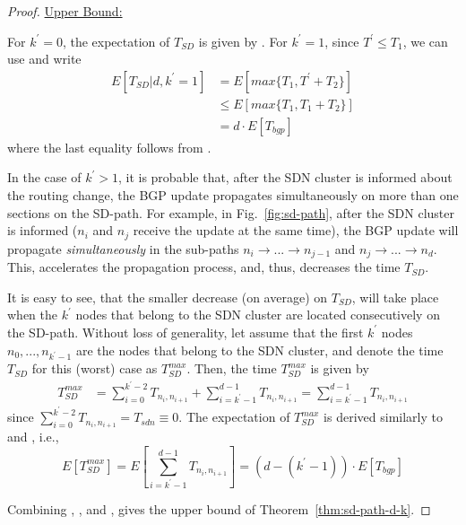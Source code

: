 \begin{proof}
\vspace{\baselineskip}
\noindent\underline{Upper Bound:}

For $k^{'}=0$, the expectation of $T_{SD}$ is given by . For $k^{'}=1$, since $T^{'}\leq T_{1}$, we can use  and write
\begin{align}
E[T_{SD}|d,k^{'}=1] 
&= E\left[max\{T_{1} , T^{'}+T_{2}\}\right] \\
&\leq E\left[max\{T_{1} , T_{1}+T_{2}\}\right] \\
&= d\cdot E[T_{bgp}] \label{eq:upper-bound-k=1}
\end{align}
where the last equality follows from .

In the case of $k^{'}>1$, it is probable that, after the SDN cluster is informed about the routing change, the BGP update propagates simultaneously on more than one sections on the SD-path. For example, in Fig.~\ref{fig:sd-path}, after the SDN cluster is informed ($n_{i}$ and $n_{j}$ receive the update at the same time), the BGP update will propagate \textit{simultaneously} in the sub-paths $n_{i}\rightarrow ...\rightarrow n_{j-1}$ and $n_{j}\rightarrow ...\rightarrow n_{d}$. This, accelerates the propagation process, and, thus, decreases the time $T_{SD}$. 

It is easy to see, that the smaller decrease (on average) on $T_{SD}$, will take place when the $k^{'}$ nodes that belong to the SDN cluster are located consecutively on the SD-path. Without loss of generality, let assume that the first $k^{'}$ nodes $n_{0},...,n_{k^{'}-1}$ are the nodes that belong to the SDN cluster, and denote the time $T_{SD}$ for this (worst) case as $T_{SD}^{max}$. Then, the time $T_{SD}^{max}$ is given by
\begin{align}
T_{SD}^{max} 	&= \sum_{i=0}^{k^{'}-2}T_{n_{i},n_{i+1}} + \sum_{i=k^{'}-1}^{d-1}T_{n_{i},n_{i+1}} = \sum_{i=k^{'}-1}^{d-1}T_{n_{i},n_{i+1}}
\end{align}
since $\sum_{i=0}^{k^{'}-2}T_{n_{i},n_{i+1}} = T_{sdn}\equiv 0$. The expectation of $T_{SD}^{max}$ is derived similarly to  and , i.e., 
\begin{equation}\label{eq:T-sd-max}
E[T_{SD}^{max}] = E\left[\sum_{i=k^{'}-1}^{d-1}T_{n_{i},n_{i+1}}\right] = \left(d-(k^{'}-1)\right)\cdot E[T_{bgp}]
\end{equation}

Combining , , and , gives the upper bound of Theorem~\ref{thm:sd-path-d-k}.
\end{proof}





